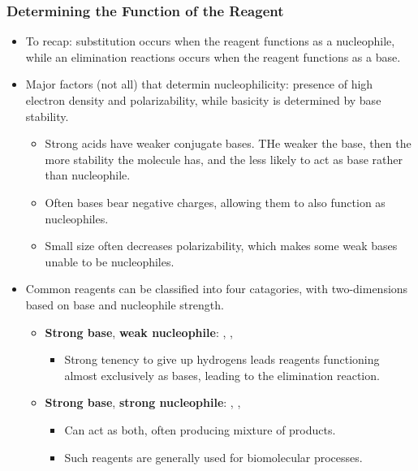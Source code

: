 \documentclass[12pt,a4paper]{article}
\begin{document}
\begin{itemize}
    \subsubsection{Determining the Function of the Reagent}
    \begin{itemize}
        \item To recap: substitution occurs when the reagent functions as a nucleophile, while an elimination reactions occurs when the reagent functions as a base.
        \item Major factors (not all) that determin nucleophilicity: presence of high electron density and polarizability, while basicity is determined by base stability.
            \begin{itemize}
                \item Strong acids have weaker conjugate bases. THe weaker the base, then the more stability the molecule has, and the less likely to act as base rather than nucleophile.
                \item Often bases bear negative charges, allowing them to also function as nucleophiles.
                \item Small size often decreases polarizability, which makes some weak bases unable to be nucleophiles.
            \end{itemize}
        \item Common reagents can be classified into four catagories, with two-dimensions based on base and nucleophile strength.
            \begin{itemize}
                \item \textbf{Strong base}, {\color{darklc}\textbf{weak nucleophile}}: , , 
                \begin{itemize}
                    \item Strong tenency to give up hydrogens leads reagents functioning almost exclusively as bases, leading to the elimination reaction.
                \end{itemize}
                \item \textbf{Strong base}, \textbf{strong nucleophile}: {\color{neg}}, {\color{neg}}, {\color{neg}}\begin{itemize}
                    \item Can act as both, often producing mixture of products.
                    \item Such reagents are generally used for biomolecular processes.
                \end{itemize}

\end{itemize}
\end{itemize}
\end{itemize}
\end{document}
